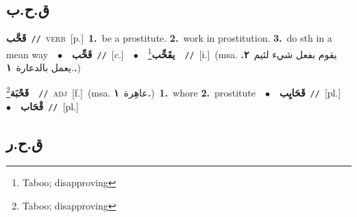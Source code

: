 \documentclass[10pt,a4paper,twoside]{article} %
\begin{document}
\begin{multicols}{2}
\vspace{-3mm}
\subsection*{\color{blue}\foreignlanguage{arabic}{ق.ح.ب}\color{blue}{}} 

{\setlength\topsep{0pt}\textbf{\foreignlanguage{arabic}{قَحَّب}}\ {\color{gray}\texttt{//}\color{black}}\ \textsc{verb}\ [p.]\ \textbf{1.}~be a prostitute.  \textbf{2.}~work in prostitution.  \textbf{3.}~do sth in a mean way\ \ $\bullet$\ \ \setlength\topsep{0pt}\textbf{\foreignlanguage{arabic}{قَحِّب}}\ {\color{gray}\texttt{//}\color{black}}\ [c.]\ \ $\bullet$\ \ \setlength\topsep{0pt}\textbf{\foreignlanguage{arabic}{يقَحِّب}}\footnote{Taboo; disapproving}\ \ {\color{gray}\texttt{//}\color{black}}\ [i.]\ \color{gray}(msa. \foreignlanguage{arabic}{يقوم بفعل شيء لئيم}~\foreignlanguage{arabic}{\textbf{٢.}}  .\foreignlanguage{arabic}{يعمل بالدعارة}~\foreignlanguage{arabic}{\textbf{١.}})\color{black}\ } \vspace{2mm}

{\setlength\topsep{0pt}\textbf{\foreignlanguage{arabic}{قَحْبَة}}\footnote{Taboo; disapproving}\ \ {\color{gray}\texttt{//}\color{black}}\ \textsc{adj}\ [f.]\ \color{gray}(msa. \foreignlanguage{arabic}{عاهِرة}~\foreignlanguage{arabic}{\textbf{١.}})\color{black}\ \textbf{1.}~whore  \textbf{2.}~prostitute\ \ $\bullet$\ \ \setlength\topsep{0pt}\textbf{\foreignlanguage{arabic}{قَحَايِب}}\ {\color{gray}\texttt{//}\color{black}}\ [pl.]\ \ $\bullet$\ \ \setlength\topsep{0pt}\textbf{\foreignlanguage{arabic}{قْحَاب}}\ {\color{gray}\texttt{//}\color{black}}\ [pl.]\ } \vspace{2mm}

\vspace{-3mm}
\subsection*{\color{blue}\foreignlanguage{arabic}{ق.ح.ر}\color{blue}{}} 


\end{multicols}
\end{document}
